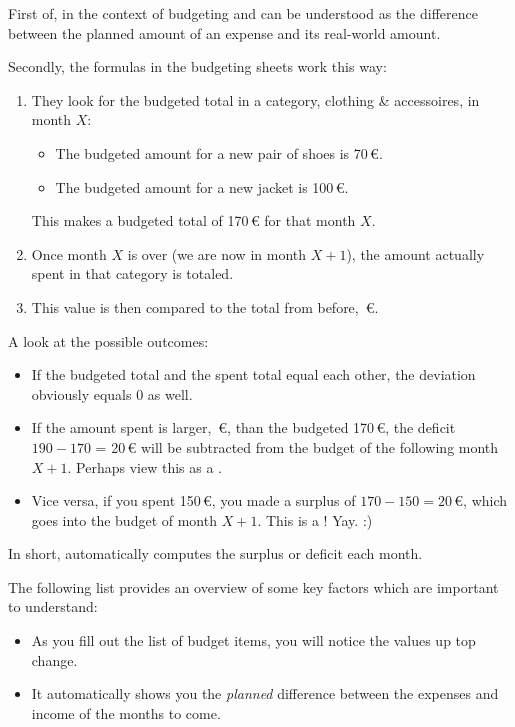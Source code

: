 First of,  in the context of budgeting and \tfn can be understood as the difference between the planned amount of an expense and its real-world amount.

Secondly, the formulas in the budgeting sheets work this way:
\begin{enumerate}
	\item They look for the budgeted total in a category, \eg clothing \& accessoires, in month \( X \):
	\begin{itemize}
		\item The budgeted amount for a new pair of shoes is 70\,€.
		\item The budgeted amount for a new jacket is 100\,€.
	\end{itemize}
	This makes a budgeted total of 170\,€ for that month \( X \).
	\item Once month \( X \) is over (we are now in month \( X+1 \)), the amount actually spent in that category is totaled.
	\item This value is then compared to the total from before, \,€.
\end{enumerate}

A look at the possible outcomes:
\begin{itemize}
	\item If the budgeted total and the spent total equal each other, the deviation obviously equals 0 as well.
	\item If the amount spent is larger, \,€, than the budgeted 170\,€, the deficit \( 190-170 \) = 20\,€ will be subtracted from the budget of the following month \( X+1 \).
	Perhaps view this as a .
	\item Vice versa, if you spent 150\,€, you made a surplus of \( 170-150 = 20 \)\,€, which goes into the budget of month \( X+1 \).
	This is a ! Yay. :)
\end{itemize}

In short, \tfn automatically computes the surplus or deficit each month.

The following list provides an overview of some key factors which are important to understand:
\begin{itemize}
	\item As you fill out the list of budget items, you will notice the values up top change.
	\item It automatically shows you the \emph{planned} difference between the expenses and income of the months to come.
\end{itemize}

